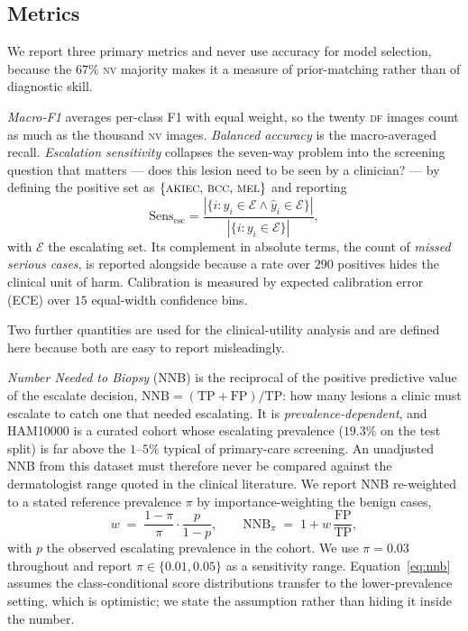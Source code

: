 \documentclass[journal]{IEEEtran}
\newcommand{\escset}{\{\textsc{akiec},\,\textsc{bcc},\,\textsc{mel}\}}
\begin{document}
\subsection{Metrics}
\label{sec:metrics}
We report three primary metrics and never use accuracy for model selection, because the
$67\%$ \textsc{nv} majority makes it a measure of prior-matching rather than of diagnostic
skill.

\emph{Macro-F1} averages per-class F1 with equal weight, so the twenty \textsc{df} images
count as much as the thousand \textsc{nv} images. \emph{Balanced accuracy} is the macro-averaged
recall. \emph{Escalation sensitivity} collapses the seven-way problem into the screening
question that matters --- does this lesion need to be seen by a clinician? --- by defining the
positive set as $\escset$ and reporting
\begin{equation}
\mathrm{Sens}_{\mathrm{esc}} = \frac{|\{i : y_i \in \mathcal{E} \wedge \hat{y}_i \in \mathcal{E}\}|}
                                     {|\{i : y_i \in \mathcal{E}\}|},
\end{equation}
with $\mathcal{E}$ the escalating set. Its complement in absolute terms, the count of
\emph{missed serious cases}, is reported alongside because a rate over $290$ positives hides
the clinical unit of harm. Calibration is measured by expected calibration error (ECE) over
$15$ equal-width confidence bins.

Two further quantities are used for the clinical-utility analysis and are defined here
because both are easy to report misleadingly.

\emph{Number Needed to Biopsy} (NNB) is the reciprocal of the positive predictive value of
the escalate decision, $\mathrm{NNB} = (\mathrm{TP}+\mathrm{FP})/\mathrm{TP}$: how many
lesions a clinic must escalate to catch one that needed escalating. It is
\emph{prevalence-dependent}, and HAM10000 is a curated cohort whose escalating prevalence
($19.3\%$ on the test split) is far above the $1$--$5\%$ typical of primary-care screening.
An unadjusted NNB from this dataset must therefore never be compared against the
dermatologist range quoted in the clinical literature. We report NNB re-weighted to a stated
reference prevalence $\pi$ by importance-weighting the benign cases,
\begin{equation}
w \;=\; \frac{1-\pi}{\pi}\cdot\frac{p}{1-p},
\qquad
\mathrm{NNB}_{\pi} \;=\; 1 + w\,\frac{\mathrm{FP}}{\mathrm{TP}},
\label{eq:nnb}
\end{equation}
with $p$ the observed escalating prevalence in the cohort. We use $\pi = 0.03$ throughout and
report $\pi \in \{0.01, 0.05\}$ as a sensitivity range. Equation~\eqref{eq:nnb} assumes the
class-conditional score distributions transfer to the lower-prevalence setting, which is
optimistic; we state the assumption rather than hiding it inside the number.
\end{document}
